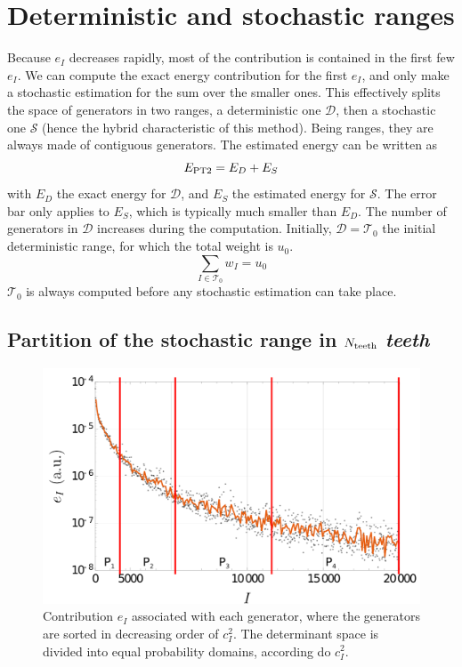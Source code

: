 \documentclass[./thesis.tex]{subfiles}
\begin{document}
\section{Deterministic and stochastic ranges}
Because $e_I$ decreases rapidly, most of the contribution is contained in the first few $e_I$. We can compute the exact energy contribution for the first $e_I$, and only make a stochastic estimation for the sum over the smaller ones. This effectively splits the space of generators in two ranges, a deterministic one $\mathcal{D}$, then a stochastic one $\mathcal{S}$ (hence the hybrid characteristic of this method). Being ranges, they are always made of contiguous generators. The estimated energy can be written as
\begin{equation}
E_\text{PT2} = E_D + E_S
\end{equation}
with $E_D$ the exact energy for $\mathcal{D}$, and $E_S$ the estimated energy for $\mathcal{S}$. The error bar only applies to $E_S$, which is typically much smaller than $E_D$.
The number of generators in $\mathcal{D}$ increases during the computation. Initially, $\mathcal{D}=\mathcal{T}_0$ the initial deterministic range, for which the total weight is $u_0$.
\begin{equation}
\sum_{I \in \mathcal{T}_0} w_I=u_0
\end{equation}
$\mathcal{T}_0$ is always computed before any stochastic estimation can take place.

\subsection{Partition of the stochastic range in $N_\text{teeth}$ \emph{teeth}}
\label{sec:partition}

\begin{figure}[h!]
	\begin{center}
		\includegraphics[width=0.7\columnwidth]{figures/pt2/P_i}
	\end{center}
	\caption{Contribution $e_I$ associated with each generator, where the generators are sorted in decreasing order of $c_I^2$. The determinant space is divided into equal probability domains, according do $c_I^2$.}
	\label{fig:p_i}
\end{figure}
\end{document}
